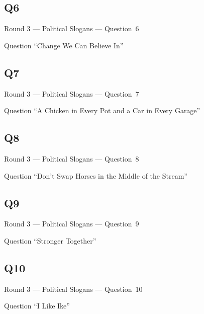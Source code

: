 \documentclass[11pt]{beamer}
\begin{document}
\subsection*{Q6}
\begin{frame}[t]{Round 3 --- Political Slogans --- \mbox{Question 6}}
\vspace{-0.5em}
\begin{block}{Question}
``Change We Can Believe In''
\end{block}
\end{frame}
\subsection*{Q7}
\begin{frame}[t]{Round 3 --- Political Slogans --- \mbox{Question 7}}
\vspace{-0.5em}
\begin{block}{Question}
``A Chicken in Every Pot and a Car in Every Garage''
\end{block}
\end{frame}
\subsection*{Q8}
\begin{frame}[t]{Round 3 --- Political Slogans --- \mbox{Question 8}}
\vspace{-0.5em}
\begin{block}{Question}
``Don't Swap Horses in the Middle of the Stream''
\end{block}
\end{frame}
\subsection*{Q9}
\begin{frame}[t]{Round 3 --- Political Slogans --- \mbox{Question 9}}
\vspace{-0.5em}
\begin{block}{Question}
``Stronger Together''
\end{block}
\end{frame}
\subsection*{Q10}
\begin{frame}[t]{Round 3 --- Political Slogans --- \mbox{Question 10}}
\vspace{-0.5em}
\begin{block}{Question}
``I Like Ike'' 
\end{block}
\end{frame}
\end{document}
